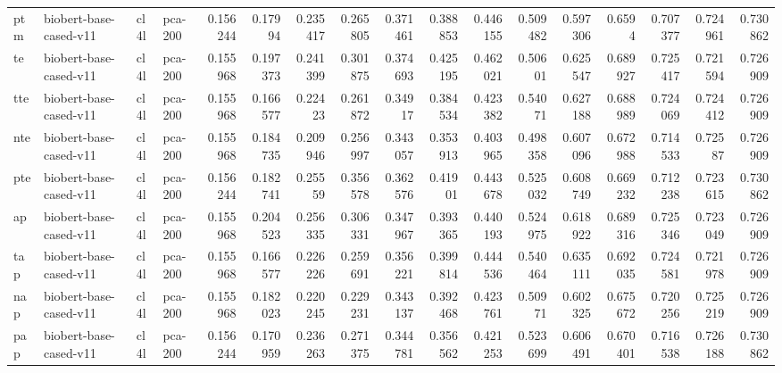\begin{tabular}{llllrrrrrrrrrrrrr}
 ptm         & biobert-base-cased-v11 & cl4l             & pca-200               &     0.156244 &     0.17994  &     0.235417 &     0.265805 &     0.371461 &     0.388853 &     0.446155 &     0.509482 &     0.597306 &     0.6594   &      0.707377 &      0.724961 &      0.730862 \\
 te          & biobert-base-cased-v11 & cl4l             & pca-200               &     0.155968 &     0.197373 &     0.241399 &     0.301875 &     0.374693 &     0.425195 &     0.462021 &     0.50601  &     0.625547 &     0.689927 &      0.725417 &      0.721594 &      0.726909 \\
 tte         & biobert-base-cased-v11 & cl4l             & pca-200               &     0.155968 &     0.166577 &     0.22423  &     0.261872 &     0.34917  &     0.384534 &     0.423382 &     0.54071  &     0.627188 &     0.688989 &      0.724069 &      0.724412 &      0.726909 \\
 nte         & biobert-base-cased-v11 & cl4l             & pca-200               &     0.155968 &     0.184735 &     0.209946 &     0.256997 &     0.343057 &     0.353913 &     0.403965 &     0.498358 &     0.607096 &     0.672988 &      0.714533 &      0.72587  &      0.726909 \\
 pte         & biobert-base-cased-v11 & cl4l             & pca-200               &     0.156244 &     0.182741 &     0.25559  &     0.356578 &     0.362576 &     0.41901  &     0.443678 &     0.525032 &     0.608749 &     0.669232 &      0.712238 &      0.723615 &      0.730862 \\
 ap          & biobert-base-cased-v11 & cl4l             & pca-200               &     0.155968 &     0.204523 &     0.256335 &     0.306331 &     0.347967 &     0.393365 &     0.440193 &     0.524975 &     0.618922 &     0.689316 &      0.725346 &      0.723049 &      0.726909 \\
 tap         & biobert-base-cased-v11 & cl4l             & pca-200               &     0.155968 &     0.166577 &     0.226226 &     0.259691 &     0.356221 &     0.399814 &     0.444536 &     0.540464 &     0.635111 &     0.692035 &      0.724581 &      0.721978 &      0.726909 \\
 nap         & biobert-base-cased-v11 & cl4l             & pca-200               &     0.155968 &     0.182023 &     0.220245 &     0.229231 &     0.343137 &     0.392468 &     0.423761 &     0.50971  &     0.602325 &     0.675672 &      0.720256 &      0.725219 &      0.726909 \\
 pap         & biobert-base-cased-v11 & cl4l             & pca-200               &     0.156244 &     0.170959 &     0.236263 &     0.271375 &     0.344781 &     0.356562 &     0.421253 &     0.523699 &     0.606491 &     0.670401 &      0.716538 &      0.726188 &      0.730862 \\

\end{tabular}
